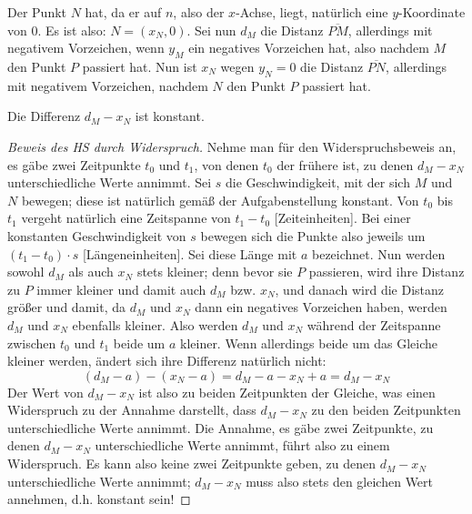 Der Punkt $N$ hat, da er auf $n$, also der $x$-Achse, liegt, natürlich eine $y$-Koordinate von 0. Es ist also: 
$N=(x_N, 0)$. Sei nun $d_M$ die Distanz $\overline{PM}$, allerdings mit negativem Vorzeichen, wenn $y_M$ ein 
negatives Vorzeichen hat, also nachdem $M$ den Punkt $P$ passiert hat. Nun ist $x_N$ wegen $y_N=0$ die Distanz 
$\overline{PN}$, allerdings mit negativem Vorzeichen, nachdem $N$ den Punkt $P$ passiert hat. 
\begin{lem}
    Die Differenz $d_M-x_N$ ist konstant.
\end{lem}
\begin{proof}[Beweis des HS durch Widerspruch]
    Nehme man für den Widerspruchsbeweis an, es gäbe zwei Zeitpunkte $t_0$ und $t_1$, von denen $t_0$ der frühere ist, 
    zu denen $d_M-x_N$ unterschiedliche Werte annimmt. Sei $s$ die Geschwindigkeit, mit der sich $M$ und $N$ bewegen; 
    diese ist natürlich gemäß der Aufgabenstellung konstant. Von $t_0$ bis $t_1$ vergeht natürlich eine Zeitspanne 
    von $t_1-t_0$ [Zeiteinheiten]. Bei einer konstanten Geschwindigkeit von $s$ bewegen sich die Punkte also jeweils 
    um $(t_1-t_0)\cdot s$ [Längeneinheiten]. Sei diese Länge mit $a$ bezeichnet. Nun werden sowohl $d_M$ als auch $x_N$ 
    stets kleiner; denn bevor sie $P$ passieren, wird ihre Distanz zu $P$ immer kleiner und damit auch $d_M$ bzw. $x_N$, 
    und danach wird die Distanz größer und damit, da $d_M$ und $x_N$ dann ein negatives Vorzeichen haben, werden $d_M$ 
    und $x_N$ ebenfalls kleiner. Also werden $d_M$ und $x_N$ während der Zeitspanne zwischen $t_0$ und $t_1$ beide um 
    $a$ kleiner. Wenn allerdings beide um das Gleiche kleiner werden, ändert sich ihre Differenz natürlich nicht:
    \[
        (d_M-a)-(x_N-a)=d_M-a-x_N+a=d_M-x_N
    \]
    Der Wert von $d_M-x_N$ ist also zu beiden Zeitpunkten der Gleiche, was einen Widerspruch zu der Annahme darstellt, 
    dass $d_M-x_N$ zu den beiden Zeitpunkten unterschiedliche Werte annimmt. Die Annahme, es gäbe zwei Zeitpunkte, zu 
    denen $d_M-x_N$ unterschiedliche Werte annimmt, führt also zu einem Widerspruch. Es kann also keine zwei 
    Zeitpunkte geben, zu denen $d_M-x_N$ unterschiedliche Werte annimmt; $d_M-x_N$ muss also stets den gleichen Wert 
    annehmen, d.h. konstant sein!
\end{proof}



